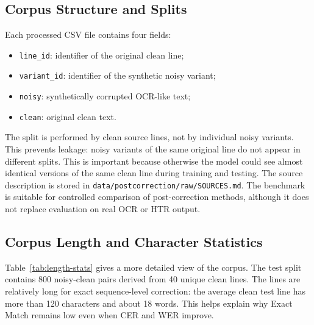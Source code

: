 \documentclass{article}
\begin{document}
\subsection{Corpus Structure and Splits}

Each processed CSV file contains four fields:
\begin{itemize}
    \item \texttt{line\_id}: identifier of the original clean line;
    \item \texttt{variant\_id}: identifier of the synthetic noisy variant;
    \item \texttt{noisy}: synthetically corrupted OCR-like text;
    \item \texttt{clean}: original clean text.
\end{itemize}

The split is performed by clean source lines, not by individual noisy variants. This prevents leakage: noisy variants of the same original line do not appear in different splits. This is important because otherwise the model could see almost identical versions of the same clean line during training and testing. The source description is stored in \texttt{data/postcorrection/raw/SOURCES.md}. The benchmark is suitable for controlled comparison of post-correction methods, although it does not replace evaluation on real OCR or HTR output.

\begin{table}[tbh!]
\begin{center}

\caption{Dataset split statistics for the proposed Arabic-script Turkic OCR post-correction benchmark.}
\label{tab:dataset}
\end{center}
\end{table}

\subsection{Corpus Length and Character Statistics}

Table~\ref{tab:length-stats} gives a more detailed view of the corpus. The test split contains 800 noisy-clean pairs derived from 40 unique clean lines. The lines are relatively long for exact sequence-level correction: the average clean test line has more than 120 characters and about 18 words. This helps explain why Exact Match remains low even when CER and WER improve.

\begin{table}[tbh!]
\begin{center}
\small

\caption{Length statistics for the processed noisy-clean splits.}
\label{tab:length-stats}
\end{center}
\end{table}
\end{document}
